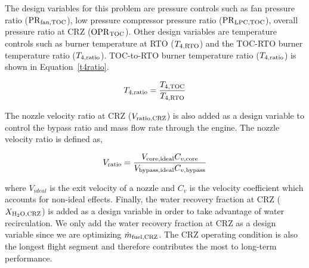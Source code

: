 \documentclass[conf]{new-aiaa}
\begin{document}

The design variables for this problem are pressure controls such as fan pressure ratio ($\rm{PR}_{\rm{fan,TOC}}$), low pressure compressor pressure ratio ($\rm{PR}_{\rm{LPC,TOC}}$), overall pressure ratio at CRZ ($\rm{OPR}_{\rm{TOC}}$).
Other design variables are temperature controls such as burner temperature at RTO ($T_{4,\rm{RTO}}$) and the TOC-RTO burner temperature ratio ($T_{4,\rm{ratio}}$).
TOC-to-RTO burner temperature ratio ($T_{4,\rm{ratio}}$) is shown in Equation~\eqref{t4ratio}.

\begin{equation}
    T_{4,\rm{ratio}} = \frac{T_{4,\rm{TOC}}}{T_{4,\rm{RTO}}}
    \label{t4ratio}
\end{equation}

\noindent
The nozzle velocity ratio at CRZ ($V_{\rm{ratio,CRZ}}$) is also added as a design variable to control the bypass ratio and mass flow rate through the engine.
The nozzle velocity ratio is defined as,

\begin{equation}
    V_{\rm{ratio}} = \frac{V_{\rm{core,ideal}}C_{v,\rm{core}}}{V_{\rm{bypass,ideal}}C_{v,\rm{bypass}}}
    \label{eq:vratio}
\end{equation}

\noindent
where $V_{ideal}$ is the exit velocity of a nozzle and $C_v$ is the velocity coefficient which accounts for non-ideal effects.
Finally, the water recovery fraction at CRZ ($X_{\rm{H_2O,CRZ}}$) is added as a design variable in order to take advantage of water recirculation.
We only add the water recovery fraction at CRZ as a design variable since we are optimizing $\dot{m}_{\rm{fuel,CRZ}}$.
The CRZ operating condition is also the longest flight segment and therefore contributes the most to long-term performance.
\end{document}
